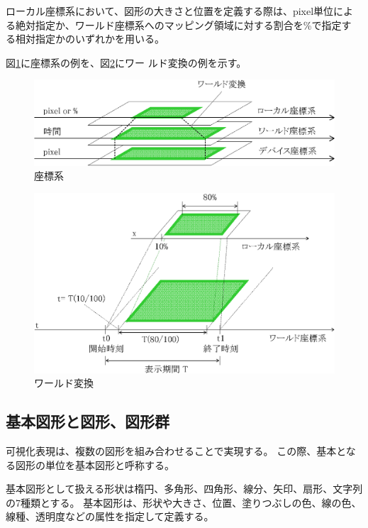 ローカル座標系において、図形の大きさと位置を定義する際は、pixel単位によ
る絶対指定か、ワールド座標系へのマッピング領域に対する割合を\%で指定す
る相対指定かのいずれかを用いる。

図\ref{fig:coordinate}に座標系の例を、図\ref{fig:worldTransform}にワー
ルド変換の例を示す。

\begin{figure}[tb]
\begin{center}
\includegraphics[scale=0.75]{coordinate.eps}
\caption{座標系}
\label{fig:coordinate}
\end{center}
\end{figure}

\begin{figure}[tb]
\begin{center}
\includegraphics[scale=0.75]{worldTransform.eps}
\caption{ワールド変換}
\label{fig:worldTransform}
\end{center}
\end{figure}

\subsection{基本図形と図形、図形群}\label{sec:shape}
可視化表現は、複数の図形を組み合わせることで実現する。
この際、基本となる図形の単位を基本図形と呼称する。

基本図形として扱える形状は楕円、多角形、四角形、線分、矢印、扇形、文字列の7種類とする。
基本図形は、形状や大きさ、位置、塗りつぶしの色、線の色、線種、透明度などの属性を指定して定義する。

